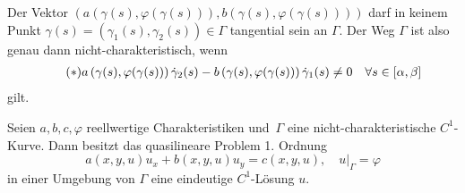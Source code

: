 \begin{einschr}
  Der Vektor $(a(\gamma(s),\varphi(\gamma(s))), b(\gamma(s),\varphi(\gamma(s))))$ darf in keinem Punkt $\gamma(s)=(\gamma_1(s),\gamma_2(s))\in\Gamma$ tangential sein an $\Gamma$. Der Weg $\Gamma$ ist also genau dann nicht-charakteristisch, wenn
  \begin{align*} \tag{$\ast$}
    a\left(\gamma(s),\varphi(\gamma(s))\right)\dot\gamma_2(s)
    -b\left(\gamma(s),\varphi(\gamma(s))\right)\dot\gamma_1(s)\neq 0\quad \forall s\in
    [\alpha,\beta]\;
  \end{align*}
  gilt.
\end{einschr}

\begin{theorem}
  Seien $a,b,c,\varphi$ reellwertige Charakteristiken und $\,\Gamma$ eine nicht-charakteristische $C^1$-Kurve. Dann besitzt das quasilineare Problem 1. Ordnung
  \[
  a(x,y,u)u_x+b(x,y,u)u_y=c(x,y,u),\quad u\vert_\Gamma=\varphi
  \]
  in einer Umgebung von $\Gamma$ eine eindeutige $C^1$-Lösung $u$.
\end{theorem}

